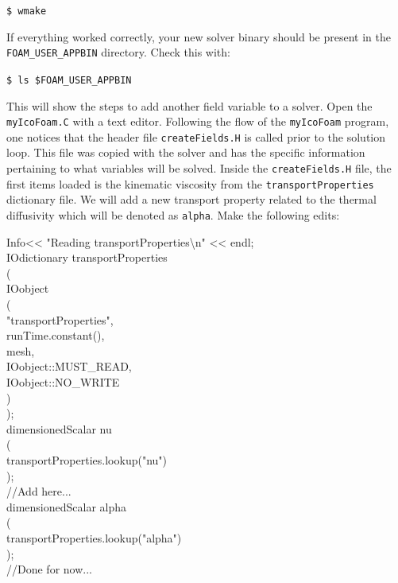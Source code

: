 \documentclass{article}
\newcommand\tab[1][0.5cm]{\hspace*{#1}}
\begin{document}
\begin{enumerate}[2.1]
	{\tt \tab \$ wmake}
	
	If everything worked correctly, your new solver binary should be present in the {\tt FOAM\_USER\_APPBIN} directory. Check this with:
	
	{\tt \tab \$ ls \$FOAM\_USER\_APPBIN }
	
	\vspace{0.2cm}
	
	This will show the steps to add another field variable to a solver. Open the {\tt myIcoFoam.C} with a text editor. Following the flow of the {\tt myIcoFoam} program, one notices that the header file {\tt createFields.H} is called prior to the solution loop. This file was copied with the solver and has the specific information pertaining to what variables will be solved. Inside the {\tt createFields.H} file, the first items loaded is the kinematic viscosity from the {\tt transportProperties} dictionary file. We will add a new transport property related to the thermal diffusivity which will be denoted as {\tt alpha}. Make the following edits: 
	

	\begin{myframe}
	{\tt %
 
		Info<< "Reading transportProperties\textbackslash n" << endl;
		\\
		
		IOdictionary transportProperties \\
		(\\
		\tab IOobject \\
		\tab ( \\
		\tab \tab "transportProperties",\\
		\tab \tab runTime.constant(), \\
		\tab \tab mesh,\\
		\tab \tab IOobject::MUST\_READ,\\
		\tab \tab IOobject::NO\_WRITE\\
		\tab )\\
		 );
		\\
		
		dimensionedScalar nu \\
		( \\
		\tab transportProperties.lookup("nu") \\
		);\\
		//Add here... \\
		dimensionedScalar alpha \\
		(\\
		\tab transportProperties.lookup("alpha")\\
		);\\
		//Done for now... \\

}
\end{myframe}
\end{enumerate}
\end{document}
